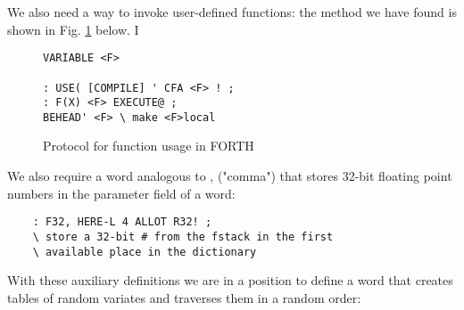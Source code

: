 We also need a way to invoke user-defined functions: the method
we have found is shown in Fig. \ref{fig:03_04} below. I

\begin{figure}[H]
    \label{fig:03_04}
    \begin{mdframed}
        \begin{lstlisting}
VARIABLE <F>

: USE( [COMPILE] ' CFA <F> ! ;
: F(X) <F> EXECUTE@ ;
BEHEAD' <F> \ make <F>local
        \end{lstlisting}
    \end{mdframed}
    \caption{Protocol for function usage in FORTH
}
\end{figure}

We also require a word analogous to , ("comma") that stores
32-bit floating point numbers in the parameter field of a word:

\begin{verbatim}
    : F32, HERE-L 4 ALLOT R32! ;
    \ store a 32-bit # from the fstack in the first
    \ available place in the dictionary
\end{verbatim}

With these auxiliary definitions we are in a position to define a
word that creates tables of random variates and traverses them in a random order:

